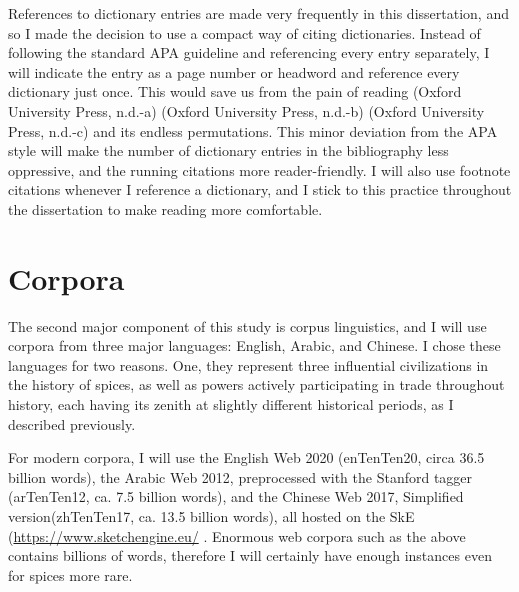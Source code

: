 





\begin{note}
    References to dictionary entries are made very frequently in this dissertation, and so I made the decision to use a compact way of citing dictionaries. Instead of following the standard APA  guideline and referencing every entry separately, I will indicate the entry as a page number or headword and reference every dictionary just once. This would save us from the pain of reading (Oxford University Press, n.d.-a) (Oxford University Press, n.d.-b) (Oxford University Press, n.d.-c) and its endless permutations. This minor deviation from the APA style will make the number of dictionary entries in the bibliography less oppressive, and the running citations more reader-friendly. I will also use footnote citations whenever I reference a dictionary, and I stick to this practice throughout the dissertation to make reading more comfortable.
\end{note}

\section{Corpora}

The second major component of this study is corpus linguistics, and I will use corpora from three major languages: English, Arabic, and Chinese. I chose these languages for two reasons. One, they represent three influential civilizations in the history of spices, as well as powers actively participating in trade throughout history, each having its zenith at slightly different historical periods, as I described previously. 

For modern corpora, I will use the English Web 2020 (enTenTen20, circa 36.5 billion words), the Arabic Web 2012, preprocessed with the Stanford tagger (arTenTen12, ca. 7.5 billion words), and the Chinese Web 2017, Simplified version(zhTenTen17, ca. 13.5 billion words), all hosted on the \gls{SkE} (\url{https://www.sketchengine.eu/} \autocite{kilgarriff_sketch_2004,kilgarriff_sketch_2014}. Enormous web corpora such as the above contains billions of words, therefore I will certainly have enough instances even for spices more rare.

